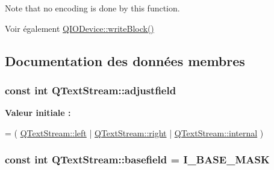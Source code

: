 Note that no encoding is done by this function.

\begin{DoxySeeAlso}{Voir également}
\hyperlink{class_q_i_o_device_a5d937df1bde2f956872dd54e077807d1}{Q\+I\+O\+Device\+::write\+Block()} 
\end{DoxySeeAlso}


\subsection{Documentation des données membres}
\hypertarget{class_q_text_stream_a22f60cd97e89709d1f32e9d2555d85a9}{}
\subsubsection[{adjustfield}]{\setlength{\rightskip}{0pt plus 5cm}const int Q\+Text\+Stream\+::adjustfield\hspace{0.3cm}{\ttfamily [static]}}\label{class_q_text_stream_a22f60cd97e89709d1f32e9d2555d85a9}
{\bfseries Valeur initiale \+:}
\begin{DoxyCode}
= ( \hyperlink{class_q_text_stream_acec251f58a9b0a3a44e51f11459489fdabba365c2a6c58ad9df5e9443a5e18af7}{QTextStream::left} |
                       \hyperlink{class_q_text_stream_acec251f58a9b0a3a44e51f11459489fda766ae97bc47754f839cccd1040b288af}{QTextStream::right} |
                       \hyperlink{class_q_text_stream_acec251f58a9b0a3a44e51f11459489fda1da33e776defe513ebbaef475383591b}{QTextStream::internal} )
\end{DoxyCode}
\hypertarget{class_q_text_stream_af3f86710e9a559feb59d4b5e08017bed}{}
\subsubsection[{basefield}]{\setlength{\rightskip}{0pt plus 5cm}const int Q\+Text\+Stream\+::basefield = {\bf I\+\_\+\+B\+A\+S\+E\+\_\+\+M\+A\+S\+K}\hspace{0.3cm}{\ttfamily [static]}}\label{class_q_text_stream_af3f86710e9a559feb59d4b5e08017bed}
\hypertarget{class_q_text_stream_a01b7c551fcbc8389b7dffa2348a57066}{}
